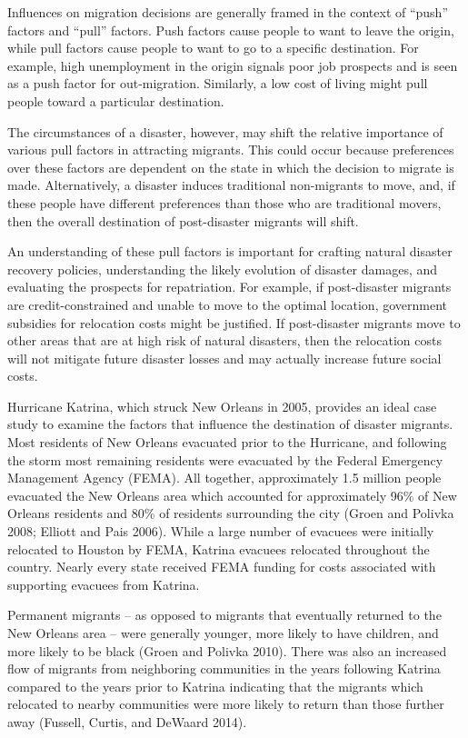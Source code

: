\documentclass[]{article}
\begin{document}
Influences on migration decisions are generally framed in the context of
``push'' factors and ``pull'' factors. Push factors cause people to want
to leave the origin, while pull factors cause people to want to go to a
specific destination. For example, high unemployment in the origin
signals poor job prospects and is seen as a push factor for
out-migration. Similarly, a low cost of living might pull people toward
a particular destination.

The circumstances of a disaster, however, may shift the relative
importance of various pull factors in attracting migrants. This could
occur because preferences over these factors are dependent on the state
in which the decision to migrate is made. Alternatively, a disaster
induces traditional non-migrants to move, and, if these people have
different preferences than those who are traditional movers, then the
overall destination of post-disaster migrants will shift.

An understanding of these pull factors is important for crafting natural
disaster recovery policies, understanding the likely evolution of
disaster damages, and evaluating the prospects for repatriation. For
example, if post-disaster migrants are credit-constrained and unable to
move to the optimal location, government subsidies for relocation costs
might be justified. If post-disaster migrants move to other areas that
are at high risk of natural disasters, then the relocation costs will
not mitigate future disaster losses and may actually increase future
social costs.

Hurricane Katrina, which struck New Orleans in 2005, provides an ideal
case study to examine the factors that influence the destination of
disaster migrants. Most residents of New Orleans evacuated prior to the
Hurricane, and following the storm most remaining residents were
evacuated by the Federal Emergency Management Agency (FEMA). All
together, approximately 1.5 million people evacuated the New Orleans
area which accounted for approximately 96\% of New Orleans residents and
80\% of residents surrounding the city (Groen and Polivka 2008; Elliott
and Pais 2006). While a large number of evacuees were initially
relocated to Houston by FEMA, Katrina evacuees relocated throughout the
country. Nearly every state received FEMA funding for costs associated
with supporting evacuees from Katrina.

Permanent migrants -- as opposed to migrants that eventually returned to
the New Orleans area -- were generally younger, more likely to have
children, and more likely to be black (Groen and Polivka 2010). There
was also an increased flow of migrants from neighboring communities in
the years following Katrina compared to the years prior to Katrina
indicating that the migrants which relocated to nearby communities were
more likely to return than those further away (Fussell, Curtis, and
DeWaard 2014).
\end{document}
